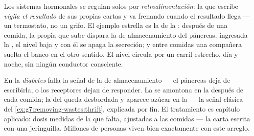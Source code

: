 \begin{proposition}\label{prop:g8:hormonal-communication:feedback}
Los sistemas hormonales se regulan solos por
\emph{retroalimentación}: la  que
escribe \emph{vigila el resultado} de sus propias cartas y va frenando
cuando el resultado llega --- un termostato, no un grifo. El ejemplo
estrella es la  de la : después de una comida, la propia
 que sube dispara la  de almacenamiento del páncreas;
ingresada la , el nivel baja y con él se apaga la secreción; y
entre comidas una  compañera suelta el banco en el otro sentido.
El nivel circula por un carril estrecho, día y noche, sin ningún
conductor consciente.
\end{proposition}
\admitted

\begin{example}\label{ex:g8:hormonal-communication:diabetes}
En la \emph{diabetes} falla la señal de la  de
almacenamiento --- el páncreas deja de escribirla, o los receptores
dejan de responder. La  se amontona en la  después de cada
comida; la  del  queda desbordada y aparece azúcar en
la  --- la señal clásica del
\cref{ex:g7:removing-wastes:thrift}, explicada por fin. El tratamiento
es capítulo aplicado: dosis medidas de la  que falta, ajustadas
a las comidas --- la carta escrita con una jeringuilla. Millones de
personas viven bien exactamente con este arreglo.
\end{example}

